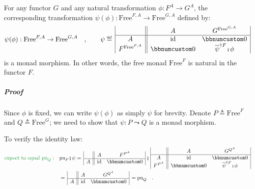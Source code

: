 For any functor $G$ and any natural transformation $\phi:F^{A}\rightarrow G^{A}$,
the corresponding transformation $\psi(\phi):\text{Free}^{F,A}\rightarrow\text{Free}^{G,A}$
defined by:
\[
\psi(\phi):\text{Free}^{F,A}\rightarrow\text{Free}^{G,A}\quad,\quad\quad\psi\triangleq\,\begin{array}{|c||cc|}
 & A & G^{\text{Free}^{G,A}}\\
\hline A & \text{id} & \bbnum 0\\
F^{\text{Free}^{F,A}} & \bbnum 0 & \overline{\psi}^{\uparrow F}\bef\phi
\end{array}
\]
is a monad morphism. In other words, the free monad $\text{Free}^{F}$
is natural in the functor $F$. 

\subparagraph{Proof}

Since $\phi$ is fixed, we can write $\psi(\phi)$ as simply $\psi$
for brevity. Denote $P\triangleq\text{Free}^{F}$ and $Q\triangleq\text{Free}^{G}$;
we need to show that $\psi:P\leadsto Q$ is a monad morphism.

To verify the identity law:
\begin{align*}
{\color{greenunder}\text{expect to equal }\text{pu}_{Q}:}\quad & \text{pu}_{P}\bef\psi=\,\begin{array}{|c||cc|}
 & A & F^{P^{A}}\\
\hline A & \text{id} & \bbnum 0
\end{array}\,\bef\,\begin{array}{|c||cc|}
 & A & G^{Q^{A}}\\
\hline A & \text{id} & \bbnum 0\\
F^{P^{A}} & \bbnum 0 & \overline{\psi}^{\uparrow F}\bef\phi
\end{array}\\
 & =\,\begin{array}{|c||cc|}
 & A & G^{Q^{A}}\\
\hline A & \text{id} & \bbnum 0
\end{array}\,=\text{pu}_{Q}\quad.
\end{align*}

